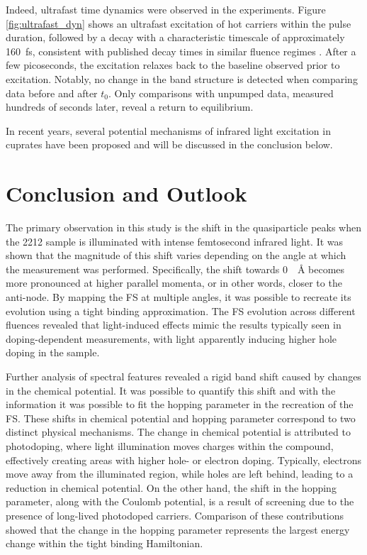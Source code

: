 Indeed, ultrafast time dynamics were observed in the experiments.
Figure \ref{fig:ultrafast_dyn} shows an ultrafast excitation of hot carriers within the pulse duration, followed by a decay with a characteristic timescale of approximately \qty{160}{\femto\second}, consistent with published decay times in similar fluence regimes \cite{dakovski_quasiparticle_2015}.
After a few picoseconds, the excitation relaxes back to the baseline observed prior to excitation.
Notably, no change in the band structure is detected when comparing data before and after $t_0$.
Only comparisons with unpumped data, measured hundreds of seconds later, reveal a return to equilibrium.

In recent years, several potential mechanisms of infrared light excitation in cuprates have been proposed and will be discussed in the conclusion below.

\section{Conclusion and Outlook}

The primary observation in this study is the shift in the quasiparticle peaks when the 2212 sample is illuminated with intense femtosecond infrared light.
It was shown that the magnitude of this shift varies depending on the angle at which the measurement was performed.
Specifically, the shift towards \qty{0}{\per\angstrom} becomes more pronounced at higher parallel momenta, or in other words, closer to the anti-node.
By mapping the FS at multiple angles, it was possible to recreate its evolution using a tight binding approximation.
The FS evolution across different fluences revealed that light-induced effects mimic the results typically seen in doping-dependent measurements, with light apparently inducing higher hole doping in the sample.

Further analysis of spectral features revealed a rigid band shift caused by changes in the chemical potential.
It was possible to quantify this shift and with the information it was possible to fit the hopping parameter in the recreation of the FS.
These shifts in chemical potential and hopping parameter correspond to two distinct physical mechanisms.
The change in chemical potential is attributed to photodoping, where light illumination moves charges within the compound, effectively creating areas with higher hole- or electron doping.
Typically, electrons move away from the illuminated region, while holes are left behind, leading to a reduction in chemical potential.
On the other hand, the shift in the hopping parameter, along with the Coulomb potential, is a result of screening due to the presence of long-lived photodoped carriers.
Comparison of these contributions showed that the change in the hopping parameter represents the largest energy change within the tight binding Hamiltonian.

